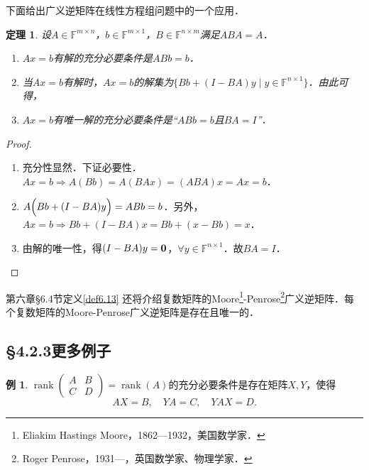 \documentclass[a4paper,fontset=windows]{ctexbook}
\newtheorem{theorem}{定理}[chapter]
\theoremstyle{definition}
\newtheorem{example}{例}[chapter]
\DeclareMathOperator{\rank}{rank}
\begin{document}
下面给出广义逆矩阵在线性方程组问题中的一个应用．

\begin{theorem}
设$A\in\mathbb{F}^{m\times n}$，$b\in\mathbb{F}^{m\times 1}$，$B\in\mathbb{F}^{n\times m}$满足$ABA=A$．
\begin{enumerate}
\item $Ax=b$有解的充分必要条件是$ABb=b$．

\item 当$Ax=b$有解时，$Ax=b$的解集为$\{Bb+(I-BA)y\mid y\in\mathbb{F}^{n\times 1}\}$．由此可得，

\item $Ax=b$有唯一解的充分必要条件是“$ABb=b$且$BA=I$”．
\end{enumerate}
\end{theorem}

\begin{proof}~
\begin{enumerate}
\item 充分性显然．下证必要性．$Ax=b\Rightarrow A(Bb)=A(BAx)=(ABA)x=Ax=b$．

\item $A\Bigl(Bb+(I-BA)y\Bigr)=ABb=b$．另外，$Ax=b\Rightarrow Bb+(I-BA)x=Bb+(x-Bb)=x$．

\item 由解的唯一性，得$(I-BA)y={\bf 0}$，$\forall y\in\mathbb{F}^{n\times 1}$．故$BA=I$．\qedhere
\end{enumerate}
\end{proof}

\medskip 第六章\S 6.4节定义\ref{def6.13} 还将介绍复数矩阵的Moore\footnote{Eliakim Hastings Moore，1862—1932，美国数学家．}-Penrose\footnote{Roger Penrose，1931—，英国数学家、物理学家．}广义逆矩阵．每个复数矩阵的Moore-Penrose广义逆矩阵是存在且唯一的．

\subsection*{\S 4.2.3\quad 更多例子}

\begin{example}
$\rank\begin{pmatrix}A&B \\ C&D\end{pmatrix}=\rank(A)$的充分必要条件是存在矩阵$X,Y$，使得
$$AX=B,\quad YA=C,\quad YAX=D.$$
\end{example}
\end{document}
